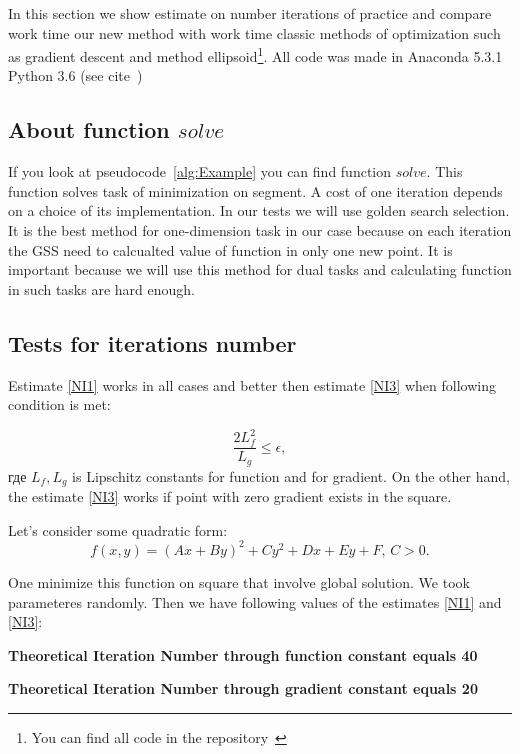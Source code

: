 \documentclass[12pt]{article}
\begin{document}
In this section we show estimate on number iterations of practice and compare work time our new method with work time classic methods of optimization such as gradient descent and method ellipsoid\footnote{You can find all code in the repository~\cite{my_git}}. All code was made in Anaconda 5.3.1 Python 3.6 (see cite~\cite{conda})

\subsection{About function $solve$}

If you look at pseudocode~\ref{alg:Example} you can find function $solve$. This function solves task of minimization on segment. A cost of one iteration depends on a choice of its implementation. In our tests we will use golden search selection. It is the best method for one-dimension task in our case because on each iteration the GSS need to calcualted value of function in only one new point. It is important because we will use this method for dual tasks and calculating function in such tasks are hard enough.

\subsection{Tests for iterations number}

Estimate \ref{NI1} works in all cases and better then estimate \ref{NI3} when following condition is met:

$$\frac{2L_f^2}{L_g}\leq \epsilon,$$
где $L_f, L_g$ is Lipschitz constants for function and for gradient. On the other hand, the estimate \ref{NI3} works if point with zero gradient exists in the square. 

Let's consider some quadratic form:
$$f(x,y) = (Ax+By)^2+Cy^2+Dx+Ey+F,\,C>0.$$

One minimize this function on square that involve global solution. We took parameteres randomly. Then we have following values of the estimates \ref{NI1} and \ref{NI3}:

\textbf{Theoretical Iteration Number through function constant equals 40}

\textbf{Theoretical Iteration Number through gradient constant equals 20}
\end{document}
